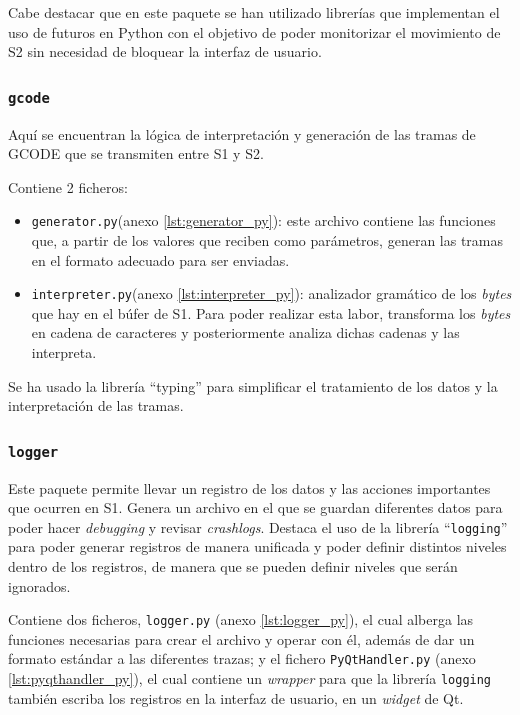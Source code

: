 Cabe destacar que en este paquete se han utilizado librerías  que implementan el uso de futuros en Python con el objetivo de poder monitorizar el movimiento de \ac{S2} sin necesidad de bloquear la interfaz de usuario.

\subsubsection{\texttt{gcode}}

Aquí se encuentran la lógica de interpretación y generación de las tramas de GCODE que se transmiten entre \ac{S1} y \ac{S2}.

Contiene 2 ficheros:

\begin{itemize}
    \item \texttt{generator.py}(anexo \ref{lst:generator_py}): este archivo contiene las funciones que, a partir de los valores que reciben como parámetros, generan las tramas en el formato adecuado para ser enviadas.
    
    \item \texttt{interpreter.py}(anexo \ref{lst:interpreter_py}): analizador gramático de los \textit{bytes} que hay en el búfer de \ac{S1}.
    Para poder realizar esta labor, transforma los \textit{bytes} en cadena de caracteres y posteriormente analiza dichas cadenas y las interpreta.
\end{itemize}

Se ha usado la librería ``typing'' para simplificar el tratamiento de los datos y la interpretación de las tramas.

\subsubsection{\texttt{logger}}

Este paquete permite llevar un registro de los datos y las acciones importantes que ocurren en \ac{S1}. Genera un archivo en el que se guardan diferentes datos para poder hacer \textit{debugging} y revisar \textit{crashlogs}.
Destaca el uso de la librería ``\texttt{logging}'' para poder generar registros de manera unificada y poder definir distintos niveles dentro de los registros, de manera que se pueden definir
niveles que serán ignorados.

Contiene dos ficheros, \texttt{logger.py} (anexo \ref{lst:logger_py}), el cual alberga las funciones necesarias para crear el archivo y operar con él, además de dar un formato estándar a las diferentes trazas;
y el fichero \texttt{PyQtHandler.py} (anexo \ref{lst:pyqthandler_py}), el cual
contiene un \textit{wrapper} para que la librería \texttt{logging} también escriba
los registros en la interfaz de usuario, en un \textit{widget} de Qt.

